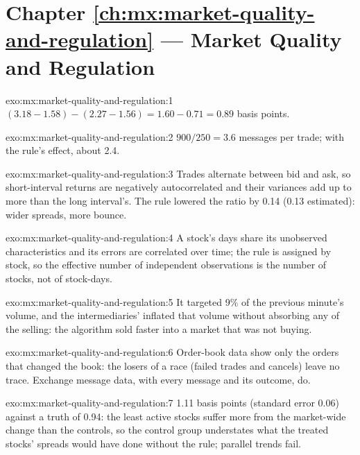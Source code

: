\section*{Chapter \ref{ch:mx:market-quality-and-regulation} --- Market Quality and Regulation}

\begin{solution}{exo:mx:market-quality-and-regulation:1}
$(3.18-1.58)-(2.27-1.56)=1.60-0.71=0.89$ basis points.
\end{solution}

\begin{solution}{exo:mx:market-quality-and-regulation:2}
$900/250=3.6$ messages per trade; with the rule's effect, about 2.4.
\end{solution}

\begin{solution}{exo:mx:market-quality-and-regulation:3}
Trades alternate between bid and ask, so short-interval returns are negatively autocorrelated and their variances add up to more than the long
interval's. The rule lowered the ratio by 0.14 (0.13 estimated): wider spreads, more bounce.
\end{solution}

\begin{solution}{exo:mx:market-quality-and-regulation:4}
A stock's days share its unobserved characteristics and its errors are correlated over time; the rule is assigned by stock, so the effective number
of independent observations is the number of stocks, not of stock-days.
\end{solution}

\begin{solution}{exo:mx:market-quality-and-regulation:5}
It targeted 9\% of the previous minute's volume, and the intermediaries'  inflated that volume without absorbing any of the selling:
the algorithm sold faster into a market that was not buying.
\end{solution}

\begin{solution}{exo:mx:market-quality-and-regulation:6}
Order-book data show only the orders that changed the book: the losers of a race (failed trades and cancels) leave no trace. Exchange message data,
with every message and its outcome, do.
\end{solution}

\begin{solution}{exo:mx:market-quality-and-regulation:7}
1.11 basis points (standard error 0.06) against a truth of 0.94: the least active stocks suffer more from the market-wide change than the controls,
so the control group understates what the treated stocks' spreads would have done without the rule; parallel trends fail.
\end{solution}

